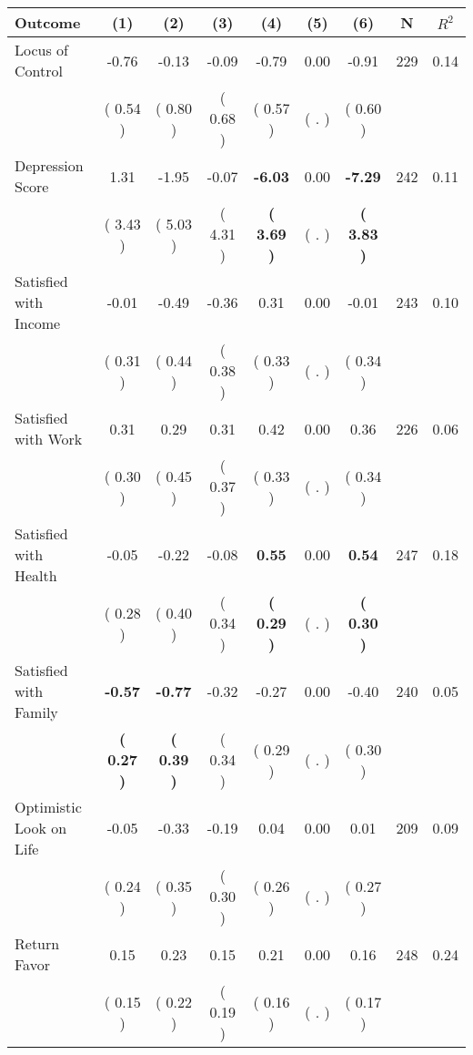 \begin{tabular}{lcccccccc}
\toprule
 \textbf{Outcome} & \textbf{(1)} & \textbf{(2)} & \textbf{(3)} & \textbf{(4)} & \textbf{(5)} & \textbf{(6)} & \textbf{N} & \textbf{$ R^2$} \\
\midrule
Locus of Control &     -0.76 &     -0.13 &     -0.09 &     -0.79 &      0.00 &     -0.91 & 229 &       0.14 \\ 
 & (     0.54 ) & (     0.80 ) & (     0.68 ) & (     0.57 ) & (        . ) & (     0.60 ) & \\
Depression Score &      1.31 &     -1.95 &     -0.07 & \textbf{    -6.03} &      0.00 & \textbf{    -7.29} & 242 &       0.11 \\ 
 & (     3.43 ) & (     5.03 ) & (     4.31 ) & \textbf{(     3.69 )} & (        . ) & \textbf{(     3.83 )} & \\
Satisfied with Income &     -0.01 &     -0.49 &     -0.36 &      0.31 &      0.00 &     -0.01 & 243 &       0.10 \\ 
 & (     0.31 ) & (     0.44 ) & (     0.38 ) & (     0.33 ) & (        . ) & (     0.34 ) & \\
Satisfied with Work &      0.31 &      0.29 &      0.31 &      0.42 &      0.00 &      0.36 & 226 &       0.06 \\ 
 & (     0.30 ) & (     0.45 ) & (     0.37 ) & (     0.33 ) & (        . ) & (     0.34 ) & \\
Satisfied with Health &     -0.05 &     -0.22 &     -0.08 & \textbf{     0.55} &      0.00 & \textbf{     0.54} & 247 &       0.18 \\ 
 & (     0.28 ) & (     0.40 ) & (     0.34 ) & \textbf{(     0.29 )} & (        . ) & \textbf{(     0.30 )} & \\
Satisfied with Family & \textbf{    -0.57} & \textbf{    -0.77} &     -0.32 &     -0.27 &      0.00 &     -0.40 & 240 &       0.05 \\ 
 & \textbf{(     0.27 )} & \textbf{(     0.39 )} & (     0.34 ) & (     0.29 ) & (        . ) & (     0.30 ) & \\
Optimistic Look on Life &     -0.05 &     -0.33 &     -0.19 &      0.04 &      0.00 &      0.01 & 209 &       0.09 \\ 
 & (     0.24 ) & (     0.35 ) & (     0.30 ) & (     0.26 ) & (        . ) & (     0.27 ) & \\
Return Favor &      0.15 &      0.23 &      0.15 &      0.21 &      0.00 &      0.16 & 248 &       0.24 \\ 
 & (     0.15 ) & (     0.22 ) & (     0.19 ) & (     0.16 ) & (        . ) & (     0.17 ) & \\

\end{tabular}
